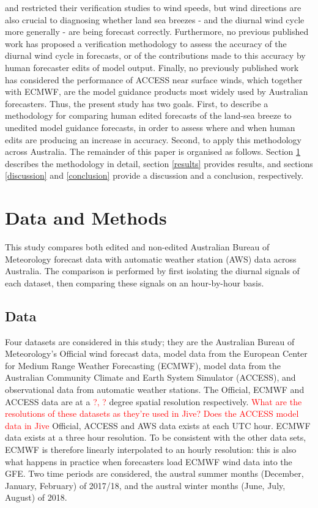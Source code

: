 \documentclass[alpha-refs]{wiley-article}
\begin{document}
\citet{pinson12} and \citet{lynch14} restricted their verification studies to wind speeds, but wind directions are also crucial to diagnosing whether land sea breezes - and the diurnal wind cycle more generally - are being forecast correctly. Furthermore, no previous published work has proposed a verification methodology to assess the accuracy of the diurnal wind cycle in forecasts, or of the contributions made to this accuracy by human forecaster edits of model output. Finally, no previously published work has considered the performance of ACCESS near surface winds, which together with ECMWF, are the model guidance products most widely used by Australian forecasters. Thus, the present study has two goals. First, to describe a methodology for comparing human edited forecasts of the land-sea breeze to unedited model guidance forecasts, in order to assess where and when human edits are producing an increase in accuracy. Second, to apply this methodology across Australia. The remainder of this paper is organised as follows. Section \ref{methods} describes the methodology in detail, section \ref{results} provides results, and sections \ref{discussion} and \ref{conclusion} provide a discussion and a conclusion, respectively.     

\section{Data and Methods} \label{methods}
This study compares both edited and non-edited Australian Bureau of Meteorology forecast data with automatic weather station (AWS) data across Australia. The comparison is performed by first isolating the diurnal signals of each dataset, then comparing these signals on an hour-by-hour basis. 

\subsection{Data} 
Four datasets are considered in this study; they are the Australian Bureau of Meteorology's Official wind forecast data, model data from the European Center for Medium Range Weather Forecasting (ECMWF), model data from the Australian Community Climate and Earth System Simulator (ACCESS), and observational data from automatic weather stations. The Official, ECMWF and ACCESS data are at a \textcolor{red}{?, ?} degree spatial resolution respectively. \textcolor{red}{What are the resolutions of these datasets as they're used in Jive? Does the ACCESS model data in Jive} Official, ACCESS and AWS data exists at each UTC hour. ECMWF data exists at a three hour resolution. To be consistent with the other data sets, ECMWF is therefore linearly interpolated to an hourly resolution: this is also what happens in practice when forecasters load ECMWF wind data into the GFE. Two time periods are considered, the austral summer months (December, January, February) of 2017/18, and the austral winter months (June, July, August) of 2018. 
\end{document}
